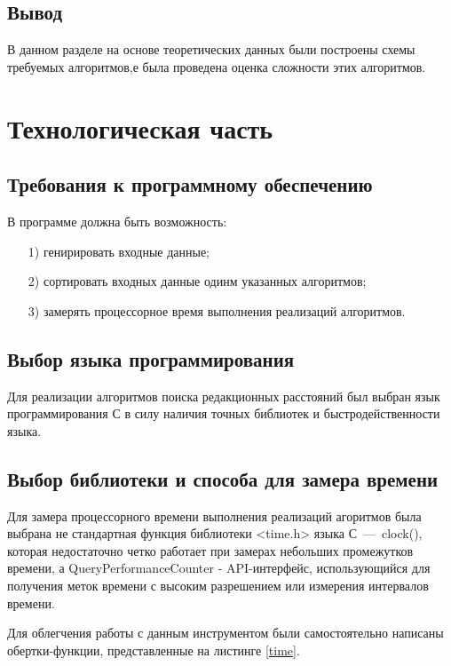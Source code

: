 \documentclass[a4paper,14pt, unknownkeysallowed]{extreport}
\begin{document}
\section*{Вывод}
	
В данном разделе на основе теоретических данных были построены схемы требуемых алгоритмов,е была проведена оценка сложности этих алгоритмов.
	
\chapter{Технологическая часть}
	
\section{Требования к программному обеспечению}
	
В программе должна быть возможность:
	
\begin{enumerate}
	\item[1)] генирировать входные данные;
	\item[2)] сортировать входных данные одинм указанных алгоритмов;
	\item[3)] замерять процессорное время выполнения реализаций алгоритмов.
\end{enumerate}
	
\section{Выбор языка программирования}
	
Для реализации алгоритмов поиска редакционных расстояний был выбран язык программирования С в силу наличия точных библиотек и быстродейственности языка.
	
\section{Выбор библиотеки и способа для замера времени}

Для замера процессорного времени выполнения реализаций агоритмов была выбрана не стандартная функция библиотеки <time.h> языка С~---~clock(), которая недостаточно четко работает при замерах небольших промежутков времени, а QueryPerformanceCounter - API-интерфейс, использующийся для получения меток времени с высоким разрешением или измерения интервалов времени.
        
Для облегчения работы с данным инструментом были самостоятельно написаны обертки-функции, представленные на листинге \ref{time}.
        
\end{document}
